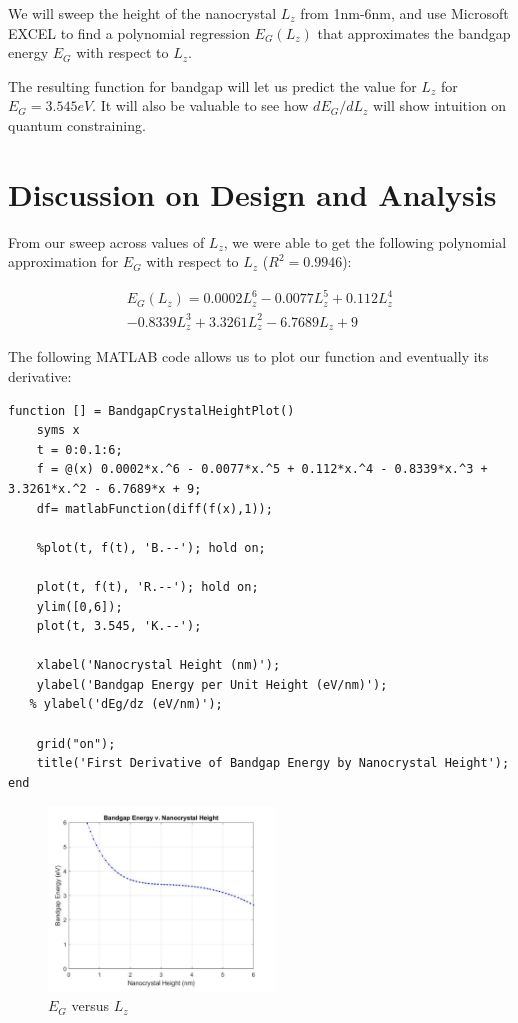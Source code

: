 \documentclass{IEEEtran}
\begin{document}
We will sweep the height of the nanocrystal \(L_z\) from 1nm-6nm, and use Microsoft EXCEL to find a polynomial regression \(E_G(L_z)\) that approximates the bandgap energy \(E_G\) with respect to \(L_z\).

The resulting function for bandgap will let us predict the value for \(L_z\) for \(E_G = 3.545eV\). It will also be valuable to see how \(dE_G / dL_z\) will show intuition on quantum constraining.

\section{Discussion on Design and Analysis}

From our sweep across values of \(L_z\), we were able to get the following polynomial approximation for \(E_G\) with respect to \(L_z\) (\(R^2 = 0.9946\)):

\begin{multline} \label{bandgap}
    E_G(L_z) = 0.0002 L_z^6 - 0.0077 L_z^5 + 0.112 L_z^4 \\ - 0.8339 L_z^3 + 3.3261 L_z^2 - 6.7689 L_z + 9
\end{multline}

The following MATLAB code allows us to plot our function and eventually its derivative:

\begin{lstlisting}
function [] = BandgapCrystalHeightPlot()
    syms x
    t = 0:0.1:6;
    f = @(x) 0.0002*x.^6 - 0.0077*x.^5 + 0.112*x.^4 - 0.8339*x.^3 + 3.3261*x.^2 - 6.7689*x + 9;
    df= matlabFunction(diff(f(x),1));

    %plot(t, f(t), 'B.--'); hold on;
  
    plot(t, f(t), 'R.--'); hold on;
    ylim([0,6]);
    plot(t, 3.545, 'K.--');

    xlabel('Nanocrystal Height (nm)');
    ylabel('Bandgap Energy per Unit Height (eV/nm)');
   % ylabel('dEg/dz (eV/nm)');
 
    grid("on");
    title('First Derivative of Bandgap Energy by Nanocrystal Height');
end
\end{lstlisting}

\begin{figure}[!h] 
    \centering
    \includegraphics*[width = 6cm]{EgVLz.png}
    \caption{\(E_G\) versus \(L_z\)}
    \label{fig:func}
\end{figure}    
\end{document}
